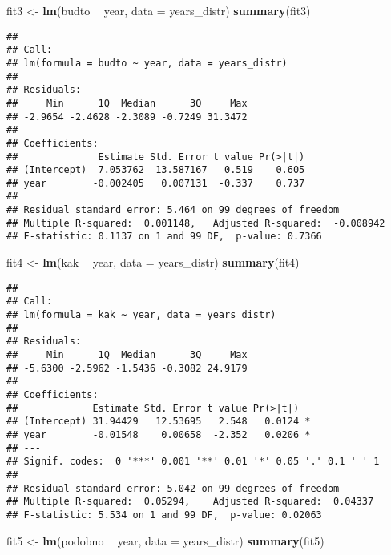 \documentclass[
]{article}
\newenvironment{Shaded}{\begin{snugshade}}{\end{snugshade}}
\newcommand{\DataTypeTok}[1]{\textcolor[rgb]{0.13,0.29,0.53}{#1}}
\newcommand{\KeywordTok}[1]{\textcolor[rgb]{0.13,0.29,0.53}{\textbf{#1}}}
\newcommand{\NormalTok}[1]{#1}
\newcommand{\OperatorTok}[1]{\textcolor[rgb]{0.81,0.36,0.00}{\textbf{#1}}}
\newcommand{\StringTok}[1]{\textcolor[rgb]{0.31,0.60,0.02}{#1}}
\begin{document}
\begin{Shaded}
\begin{Highlighting}[]
\NormalTok{fit3 <-}\StringTok{ }\KeywordTok{lm}\NormalTok{(budto }\OperatorTok{~}\StringTok{ }\NormalTok{year, }\DataTypeTok{data =}\NormalTok{ years_distr)}
\KeywordTok{summary}\NormalTok{(fit3)}
\end{Highlighting}
\end{Shaded}

\begin{verbatim}
## 
## Call:
## lm(formula = budto ~ year, data = years_distr)
## 
## Residuals:
##     Min      1Q  Median      3Q     Max 
## -2.9654 -2.4628 -2.3089 -0.7249 31.3472 
## 
## Coefficients:
##              Estimate Std. Error t value Pr(>|t|)
## (Intercept)  7.053762  13.587167   0.519    0.605
## year        -0.002405   0.007131  -0.337    0.737
## 
## Residual standard error: 5.464 on 99 degrees of freedom
## Multiple R-squared:  0.001148,   Adjusted R-squared:  -0.008942 
## F-statistic: 0.1137 on 1 and 99 DF,  p-value: 0.7366
\end{verbatim}

\begin{Shaded}
\begin{Highlighting}[]
\NormalTok{fit4 <-}\StringTok{ }\KeywordTok{lm}\NormalTok{(kak }\OperatorTok{~}\StringTok{ }\NormalTok{year, }\DataTypeTok{data =}\NormalTok{ years_distr)}
\KeywordTok{summary}\NormalTok{(fit4)}
\end{Highlighting}
\end{Shaded}

\begin{verbatim}
## 
## Call:
## lm(formula = kak ~ year, data = years_distr)
## 
## Residuals:
##     Min      1Q  Median      3Q     Max 
## -5.6300 -2.5962 -1.5436 -0.3082 24.9179 
## 
## Coefficients:
##             Estimate Std. Error t value Pr(>|t|)  
## (Intercept) 31.94429   12.53695   2.548   0.0124 *
## year        -0.01548    0.00658  -2.352   0.0206 *
## ---
## Signif. codes:  0 '***' 0.001 '**' 0.01 '*' 0.05 '.' 0.1 ' ' 1
## 
## Residual standard error: 5.042 on 99 degrees of freedom
## Multiple R-squared:  0.05294,    Adjusted R-squared:  0.04337 
## F-statistic: 5.534 on 1 and 99 DF,  p-value: 0.02063
\end{verbatim}

\begin{Shaded}
\begin{Highlighting}[]
\NormalTok{fit5 <-}\StringTok{ }\KeywordTok{lm}\NormalTok{(podobno }\OperatorTok{~}\StringTok{ }\NormalTok{year, }\DataTypeTok{data =}\NormalTok{ years_distr)}
\KeywordTok{summary}\NormalTok{(fit5)}
\end{Highlighting}
\end{Shaded}
\end{document}
